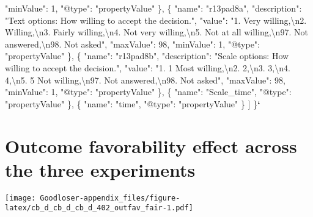 \documentclass[
]{book}
\newenvironment{Shaded}{\begin{snugshade}}{\end{snugshade}}
\newcommand{\CharTok}[1]{\textcolor[rgb]{0.31,0.60,0.02}{#1}}
\newcommand{\DataTypeTok}[1]{\textcolor[rgb]{0.13,0.29,0.53}{#1}}
\newcommand{\DecValTok}[1]{\textcolor[rgb]{0.00,0.00,0.81}{#1}}
\newcommand{\ErrorTok}[1]{\textcolor[rgb]{0.64,0.00,0.00}{\textbf{#1}}}
\newcommand{\FunctionTok}[1]{\textcolor[rgb]{0.00,0.00,0.00}{#1}}
\newcommand{\OtherTok}[1]{\textcolor[rgb]{0.56,0.35,0.01}{#1}}
\newcommand{\StringTok}[1]{\textcolor[rgb]{0.31,0.60,0.02}{#1}}
\begin{document}
\begin{Shaded}
\begin{Highlighting}[]
      \DataTypeTok{"minValue"}\FunctionTok{:} \DecValTok{1}\FunctionTok{,}
      \DataTypeTok{"@type"}\FunctionTok{:} \StringTok{"propertyValue"}
    \FunctionTok{\}}\OtherTok{,}
    \FunctionTok{\{}
      \DataTypeTok{"name"}\FunctionTok{:} \StringTok{"r13pad8a"}\FunctionTok{,}
      \DataTypeTok{"description"}\FunctionTok{:} \StringTok{"Text options: How willing to accept the decision."}\FunctionTok{,}
      \DataTypeTok{"value"}\FunctionTok{:} \StringTok{"1. Very willing,}\CharTok{\textbackslash{}n}\StringTok{2. Willing,}\CharTok{\textbackslash{}n}\StringTok{3. Fairly willing,}\CharTok{\textbackslash{}n}\StringTok{4. Not very willing,}\CharTok{\textbackslash{}n}\StringTok{5. Not at all willing,}\CharTok{\textbackslash{}n}\StringTok{97. Not answered,}\CharTok{\textbackslash{}n}\StringTok{98. Not asked"}\FunctionTok{,}
      \DataTypeTok{"maxValue"}\FunctionTok{:} \DecValTok{98}\FunctionTok{,}
      \DataTypeTok{"minValue"}\FunctionTok{:} \DecValTok{1}\FunctionTok{,}
      \DataTypeTok{"@type"}\FunctionTok{:} \StringTok{"propertyValue"}
    \FunctionTok{\}}\OtherTok{,}
    \FunctionTok{\{}
      \DataTypeTok{"name"}\FunctionTok{:} \StringTok{"r13pad8b"}\FunctionTok{,}
      \DataTypeTok{"description"}\FunctionTok{:} \StringTok{"Scale options: How willing to accept the decision."}\FunctionTok{,}
      \DataTypeTok{"value"}\FunctionTok{:} \StringTok{"1. 1 Most willing,}\CharTok{\textbackslash{}n}\StringTok{2. 2,}\CharTok{\textbackslash{}n}\StringTok{3. 3,}\CharTok{\textbackslash{}n}\StringTok{4. 4,}\CharTok{\textbackslash{}n}\StringTok{5. 5 Not willing,}\CharTok{\textbackslash{}n}\StringTok{97. Not answered,}\CharTok{\textbackslash{}n}\StringTok{98. Not asked"}\FunctionTok{,}
      \DataTypeTok{"maxValue"}\FunctionTok{:} \DecValTok{98}\FunctionTok{,}
      \DataTypeTok{"minValue"}\FunctionTok{:} \DecValTok{1}\FunctionTok{,}
      \DataTypeTok{"@type"}\FunctionTok{:} \StringTok{"propertyValue"}
    \FunctionTok{\}}\OtherTok{,}
    \FunctionTok{\{}
      \DataTypeTok{"name"}\FunctionTok{:} \StringTok{"Scale_time"}\FunctionTok{,}
      \DataTypeTok{"@type"}\FunctionTok{:} \StringTok{"propertyValue"}
    \FunctionTok{\}}\OtherTok{,}
    \FunctionTok{\{}
      \DataTypeTok{"name"}\FunctionTok{:} \StringTok{"time"}\FunctionTok{,}
      \DataTypeTok{"@type"}\FunctionTok{:} \StringTok{"propertyValue"}
    \FunctionTok{\}}
  \OtherTok{]}
\FunctionTok{\}}\ErrorTok{`}
\end{Highlighting}
\end{Shaded}

\hypertarget{outcome-favorability-effect-across-the-three-experiments}{%
\chapter{Outcome favorability effect across the three experiments}\label{outcome-favorability-effect-across-the-three-experiments}}

\texttt{[image: Goodloser-appendix\_files/figure-latex/cb\_d\_cb\_d\_cb\_d\_402\_outfav\_fair-1.pdf]}

  
\end{document}
